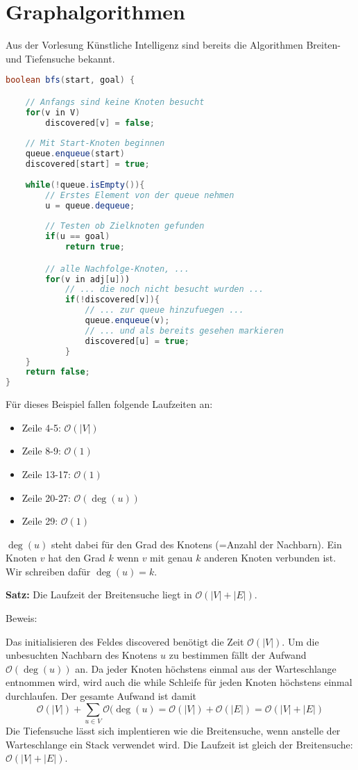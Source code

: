 \chapter{Graphalgorithmen}
Aus der Vorlesung Künstliche Intelligenz sind bereits die Algorithmen Breiten- und Tiefensuche bekannt.
\begin{lstlisting}[language=java, caption={Beispiel Algorithmus für die Breitensuche}]
boolean bfs(start, goal) {

	// Anfangs sind keine Knoten besucht
	for(v in V)
		discovered[v] = false;
	
	// Mit Start-Knoten beginnen
	queue.enqueue(start)
	discovered[start] = true;
	
	while(!queue.isEmpty()){
		// Erstes Element von der queue nehmen
		u = queue.dequeue;
		
		// Testen ob Zielknoten gefunden
		if(u == goal)
			return true;

		// alle Nachfolge-Knoten, ...
		for(v in adj[u]))
			// ... die noch nicht besucht wurden ...
			if(!discovered[v]){
				// ... zur queue hinzufuegen ...
				queue.enqueue(v);
				// ... und als bereits gesehen markieren
				discovered[u] = true;
			}
	}
	return false;
}
\end{lstlisting}
\newpage
Für dieses Beispiel fallen folgende Laufzeiten an:
\begin{itemize}
	\item Zeile 4-5: \(\mathcal{O}(|V|)\)
	\item Zeile 8-9: \(\mathcal{O}(1)\)
	\item Zeile 13-17: \(\mathcal{O}(1)\)
	\item Zeile 20-27: \(\mathcal{O}(\deg(u))\)
	\item Zeile 29: \(\mathcal{O}(1)\)
\end{itemize}
\(\deg(u)\) steht dabei für den Grad des Knotens (=Anzahl der Nachbarn).
Ein Knoten \(v\) hat den Grad \(k\) wenn \(v\) mit genau \(k\) anderen Knoten verbunden ist.
Wir schreiben dafür \(\deg(u) = k\).

\begin{shaded}
  \noindent
  \textbf{Satz:} Die Laufzeit der Breitensuche liegt in \(\mathcal{O}(|V|+|E|)\).
\end{shaded}
Beweis:

Das initialisieren des Feldes discovered benötigt die Zeit \(\mathcal{O}(|V|)\).
Um die unbesuchten Nachbarn des Knotens \(u\) zu bestimmen fällt der Aufwand \(\mathcal{O}(\deg(u))\) an.
Da jeder Knoten höchstens einmal aus der Warteschlange entnommen wird, wird auch die while Schleife für jeden Knoten höchstens einmal durchlaufen.
Der gesamte Aufwand ist damit
\[\mathcal{O}(|V|) + \sum\limits_{u \in V} \mathcal{O}(\deg(u) = \mathcal{O}(|V|) + \mathcal{O}(|E|) = \mathcal{O}(|V| + |E|)\]
Die Tiefensuche lässt sich implentieren wie die Breitensuche, wenn anstelle der Warteschlange ein Stack verwendet wird.
Die Laufzeit ist gleich der Breitensuche: \(\mathcal{O}(|V| + |E|)\).


